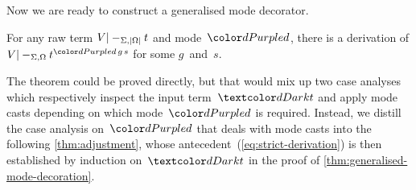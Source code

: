 
Now we are ready to construct a generalised mode decorator.

\begin{theorem}\label{thm:generalised-mode-decoration}
For any raw term $V |-_{\Sigma,\left|\Omega\right|} t$ and mode~$\dir{d}$, there is a derivation of\/ $V |-_{\Sigma,\Omega} t^{\dir{d}\,g\,s}$ for some $g$~and~$s$.
\end{theorem}

The theorem could be proved directly, but that would mix up two case analyses which respectively inspect the input term~$\isTerm{t}$ and apply mode casts depending on which mode~$\dir{d}$ is required.
Instead, we distill the case analysis on~$\dir{d}$ that deals with mode casts into the following \cref{thm:adjustment}, whose antecedent~(\ref{eq:strict-derivation}) is then established by induction on~$\isTerm{t}$ in the proof of \cref{thm:generalised-mode-decoration}.

